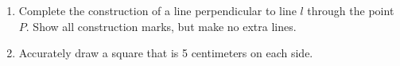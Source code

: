 \documentclass[12pt, twoside]{article}
\begin{document}
\begin{enumerate}
\newpage
\item Complete the construction of a line perpendicular to line $l$ through the point $P$. Show all construction marks, but make no extra lines. \vspace{3cm}
  \begin{center}
  \end{center} \vspace{7cm}

\item Accurately draw a square that is 5 centimeters on each side.


\end{enumerate}
\end{document}
